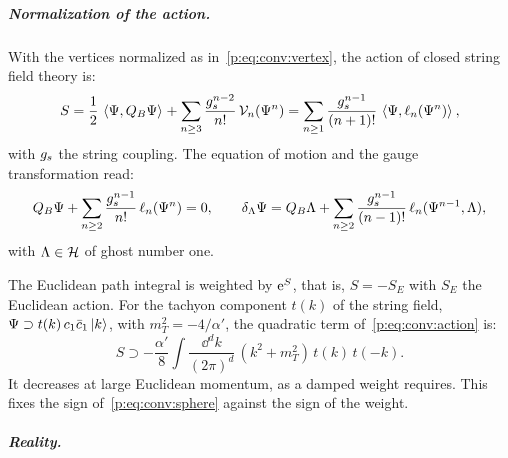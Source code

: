 \subparagraph{Normalization of the action.}

With the vertices normalized as in~\eqref{p:eq:conv:vertex}, the action of closed string field theory is:
\begin{equation}
  \label{p:eq:conv:action}
  S
    = \frac{1}{2} \, \braket{\Psi, Q_B \Psi}_{}
      + \sum_{n \ge 3} \frac{g_s^{n-2}}{n!} \, \mathcal{V}_{n}(\Psi^n)
    = \sum_{n \ge 1} \frac{g_s^{n-1}}{(n+1)!} \, \braket{\Psi, \ell_n(\Psi^n)}_{},
\end{equation}
with $g_s$ the string coupling.
The equation of motion and the gauge transformation read:
\begin{equation}
  \label{p:eq:conv:gauge}
  Q_B \Psi
    + \sum_{n \ge 2} \frac{g_s^{n-1}}{n!} \, \ell_n(\Psi^n)
    = 0,
  \qquad
  \delta_\Lambda \Psi
    = Q_B \Lambda
      + \sum_{n \ge 2} \frac{g_s^{n-1}}{(n-1)!} \, \ell_n(\Psi^{n-1}, \Lambda),
\end{equation}
with $\Lambda \in \mathcal{H}$ of ghost number one.

The Euclidean path integral is weighted by $\mathrm{e}^{S}$, that is, $S = -S_E$ with $S_E$ the Euclidean action.
  For the tachyon component $t(k)$ of the string field, $\Psi \supset t(k) \, c_1 \bar c_1 \ket{k}$, with $m_T^2 = -4/\alpha'$, the quadratic term of~\eqref{p:eq:conv:action} is:
  \begin{equation}
  \label{p:eq:conv:tachyon-quadratic}
  S
    \supset - \frac{\alpha'}{8} \int \frac{\dd^d k}{(2\pi)^d} \, (k^2 + m_T^2) \, t(k) \, t(-k).
\end{equation}
  It decreases at large Euclidean momentum, as a damped weight requires.
  This fixes the sign of~\eqref{p:eq:conv:sphere} against the sign of the weight.


\subparagraph{Reality.}


